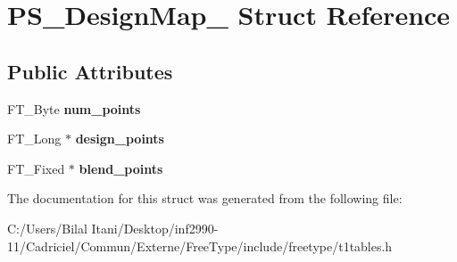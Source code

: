 \hypertarget{struct_p_s___design_map__}{}\section{P\+S\+\_\+\+Design\+Map\+\_\+ Struct Reference}
\label{struct_p_s___design_map__}
\subsection*{Public Attributes}
\begin{DoxyCompactItemize}
\item 
F\+T\+\_\+\+Byte {\bfseries num\+\_\+points}\hypertarget{struct_p_s___design_map___a505a70dd0f497f177fffca9bc4e5d0a5}{}\label{struct_p_s___design_map___a505a70dd0f497f177fffca9bc4e5d0a5}

\item 
F\+T\+\_\+\+Long $\ast$ {\bfseries design\+\_\+points}\hypertarget{struct_p_s___design_map___abd7a86ba33248ceed657c31063b49679}{}\label{struct_p_s___design_map___abd7a86ba33248ceed657c31063b49679}

\item 
F\+T\+\_\+\+Fixed $\ast$ {\bfseries blend\+\_\+points}\hypertarget{struct_p_s___design_map___a74a555fb4315fca7477f6d20d49686ec}{}\label{struct_p_s___design_map___a74a555fb4315fca7477f6d20d49686ec}

\end{DoxyCompactItemize}


The documentation for this struct was generated from the following file\+:\begin{DoxyCompactItemize}
\item 
C\+:/\+Users/\+Bilal Itani/\+Desktop/inf2990-\/11/\+Cadriciel/\+Commun/\+Externe/\+Free\+Type/include/freetype/t1tables.\+h\end{DoxyCompactItemize}
